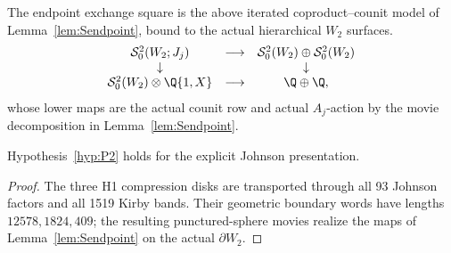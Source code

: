 The endpoint exchange square is the above iterated coproduct--counit model of
Lemma~\ref{lem:Sendpoint}, bound to the actual hierarchical $W_2$ surfaces.
\[
\begin{array}{ccc}
\mathcal S^2_0(W_2;J_j)&\longrightarrow&
\mathcal S^2_0(W_2)\oplus\mathcal S^2_0(W_2)\\
\downarrow&&\downarrow\\
\mathcal S^2_0(W_2)\otimes\Q\{1,X\}&\longrightarrow&\Q\oplus\Q,
\end{array}
\]
whose lower maps are the actual counit row and actual \(A_j\)-action by the
movie decomposition in Lemma~\ref{lem:Sendpoint}.

\begin{theorem}\label{thm:Sdischarge}
Hypothesis~\ref{hyp:P2} holds for the explicit Johnson presentation.
\end{theorem}

\begin{proof}
The three H1 compression disks are transported through all 93 Johnson factors
and all 1519 Kirby bands.  Their geometric boundary words have lengths
$12578,1824,409$; the resulting punctured-sphere movies realize the maps of
Lemma~\ref{lem:Sendpoint} on the actual $\partial W_2$.
\end{proof}
